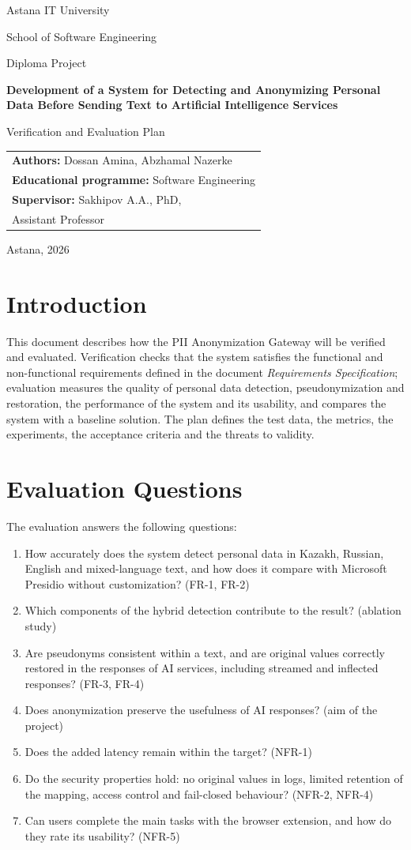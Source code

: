 \documentclass[12pt,a4paper]{article}
\makeatletter
\newcommand{\maketitlepage}[1]{%
\begin{titlepage}
\centering
{\large Astana IT University\par}
{\normalsize School of Software Engineering\par}
\vspace{4.5cm}
{\normalsize Diploma Project\par}
\vspace{0.6cm}
{\Large\bfseries Development of a System for Detecting and Anonymizing Personal Data Before Sending Text to Artificial Intelligence Services\par}
\vspace{1.2cm}
{\LARGE #1\par}
\vfill
\begin{flushright}
\begin{tabular}{@{}l@{}}
\textbf{Authors:} Dossan Amina, Abzhamal Nazerke\\
\textbf{Educational programme:} Software Engineering\\
\textbf{Supervisor:} Sakhipov A.A., PhD,\\ \hspace{2.2cm}Assistant Professor
\end{tabular}
\end{flushright}
\vspace{2.5cm}
{\normalsize Astana, 2026\par}
\end{titlepage}
\setcounter{page}{2}}
\makeatother
\begin{document}
\maketitlepage{Verification and Evaluation Plan}

\tableofcontents
\newpage

\section{Introduction}

This document describes how the PII Anonymization Gateway will be verified and evaluated. Verification checks that the system satisfies the functional and non-functional requirements defined in the document \emph{Requirements Specification}; evaluation measures the quality of personal data detection, pseudonymization and restoration, the performance of the system and its usability, and compares the system with a baseline solution. The plan defines the test data, the metrics, the experiments, the acceptance criteria and the threats to validity.

\section{Evaluation Questions}

The evaluation answers the following questions:
\begin{enumerate}[label=EQ\arabic*.,leftmargin=3em]
\item How accurately does the system detect personal data in Kazakh, Russian, English and mixed-language text, and how does it compare with Microsoft Presidio without customization? (FR-1, FR-2)
\item Which components of the hybrid detection contribute to the result? (ablation study)
\item Are pseudonyms consistent within a text, and are original values correctly restored in the responses of AI services, including streamed and inflected responses? (FR-3, FR-4)
\item Does anonymization preserve the usefulness of AI responses? (aim of the project)
\item Does the added latency remain within the target? (NFR-1)
\item Do the security properties hold: no original values in logs, limited retention of the mapping, access control and fail-closed behaviour? (NFR-2, NFR-4)
\item Can users complete the main tasks with the browser extension, and how do they rate its usability? (NFR-5)
\end{enumerate}
\end{document}

